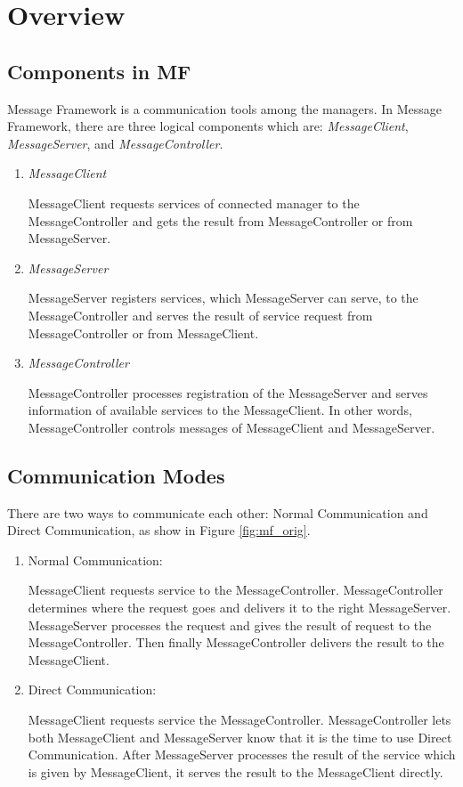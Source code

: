 \documentclass[a4paper,10pt]{article}
\begin{document}
\section{Overview}
\subsection{Components in MF}
Message Framework is a communication tools among the managers. In Message Framework, there are three logical components which are: \emph{MessageClient}, \emph{MessageServer}, and \emph{MessageController}.
\begin{enumerate}
 \item \emph{MessageClient}

 MessageClient requests services of connected manager to the MessageController and gets the result from MessageController or from MessageServer.
 \item \emph{MessageServer}

 MessageServer registers services, which MessageServer can serve, to the MessageController and serves the result of service request from MessageController or from MessageClient.
 \item \emph{MessageController}

 MessageController processes registration of the MessageServer and serves information of available services to the MessageClient. In other words, MessageController controls messages of MessageClient and MessageServer.
\end{enumerate}

\subsection{Communication Modes}

There are two ways to communicate each other: Normal Communication and Direct Communication, as show in Figure \ref{fig:mf_orig}.
\begin{enumerate}
\item{Normal Communication:}

MessageClient requests service to the MessageController. MessageController determines where the request goes and delivers it to the right MessageServer.
MessageServer processes the request and gives the result of request to the MessageController. Then finally MessageController delivers the result to the MessageClient.
\item{Direct Communication:}

MessageClient requests service the MessageController. MessageController lets both MessageClient and MessageServer know that it is the time to use Direct Communication.
After MessageServer processes the result of the service which is given by MessageClient, it serves the result to the MessageClient directly.
\end{enumerate}
\end{document}
